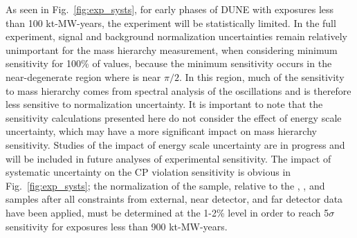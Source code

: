 As seen in Fig.~\ref{fig:exp_systs}, for early phases of DUNE
with exposures less than 100 kt-MW-years, the experiment
will be statistically limited. In the full experiment, signal and
background normalization uncertainties remain
relatively unimportant for the mass hierarchy measurement, when considering
minimum sensitivity for 100\% of \deltacp values, because the minimum sensitivity 
occurs in the near-degenerate region where \deltacp is near $\pi/2$. In this
region, much of the sensitivity to mass hierarchy comes from spectral analysis of
the oscillations and is therefore less sensitive to normalization uncertainty.
It is important to note that the sensitivity calculations presented here do not
consider the effect of energy scale uncertainty, which may have a more significant
impact on mass hierarchy sensitivity. Studies of the impact of energy scale 
uncertainty are in progress and will be included in future analyses of experimental
sensitivity. The impact of systematic uncertainty on the CP violation sensitivity
is obvious in Fig.~\ref{fig:exp_systs}; the normalization of the \nue sample,
relative to the \anue, \numu, and \anumu samples after all constraints from
external, near detector, and far detector data have been applied, must be determined 
at the 1-2\% level in order to reach 5$\sigma$ sensitivity for exposures less 
than 900 kt-MW-years.

